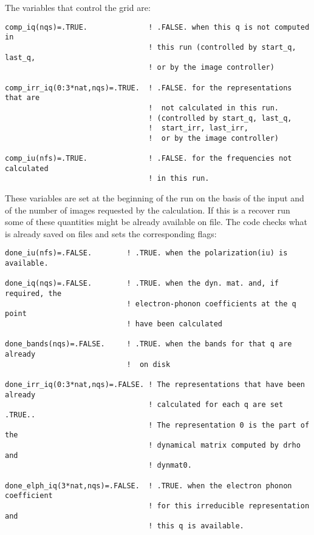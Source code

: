 \documentclass[12pt,a4paper]{article}
\begin{document}
The variables that control the grid are:

\begin{verbatim}
comp_iq(nqs)=.TRUE.              ! .FALSE. when this q is not computed in 
                                 ! this run (controlled by start_q, last_q,
                                 ! or by the image controller)

comp_irr_iq(0:3*nat,nqs)=.TRUE.  ! .FALSE. for the representations that are
                                 !  not calculated in this run.
                                 ! (controlled by start_q, last_q, 
                                 !  start_irr, last_irr, 
                                 !  or by the image controller)

comp_iu(nfs)=.TRUE.              ! .FALSE. for the frequencies not calculated 
                                 ! in this run. 

\end{verbatim}

These variables are set at the beginning of the run on the basis of
the input and of the number of images requested by the calculation.
If this is a recover run some of these quantities might be already
available on file. The code checks what is already saved on files and
sets the corresponding flags:

\begin{verbatim}
done_iu(nfs)=.FALSE.        ! .TRUE. when the polarization(iu) is available.

done_iq(nqs)=.FALSE.        ! .TRUE. when the dyn. mat. and, if required, the
                            ! electron-phonon coefficients at the q point 
                            ! have been calculated

done_bands(nqs)=.FALSE.     ! .TRUE. when the bands for that q are already 
                            !  on disk

done_irr_iq(0:3*nat,nqs)=.FALSE. ! The representations that have been already 
                                 ! calculated for each q are set .TRUE.. 
                                 ! The representation 0 is the part of the
                                 ! dynamical matrix computed by drho and
                                 ! dynmat0.

done_elph_iq(3*nat,nqs)=.FALSE.  ! .TRUE. when the electron phonon coefficient 
                                 ! for this irreducible representation and
                                 ! this q is available.

\end{verbatim}
\end{document}
